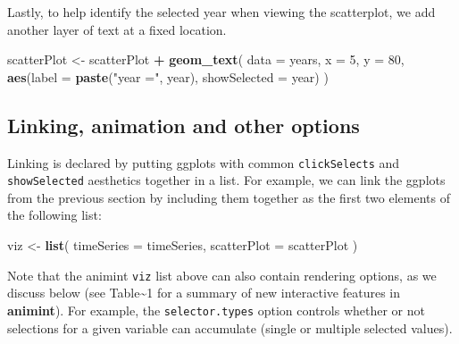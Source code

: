 \documentclass[12pt,]{article}
\newenvironment{Shaded}{\begin{snugshade}}{\end{snugshade}}
\newcommand{\DataTypeTok}[1]{\textcolor[rgb]{0.13,0.29,0.53}{#1}}
\newcommand{\DecValTok}[1]{\textcolor[rgb]{0.00,0.00,0.81}{#1}}
\newcommand{\KeywordTok}[1]{\textcolor[rgb]{0.13,0.29,0.53}{\textbf{#1}}}
\newcommand{\NormalTok}[1]{#1}
\newcommand{\OperatorTok}[1]{\textcolor[rgb]{0.81,0.36,0.00}{\textbf{#1}}}
\newcommand{\StringTok}[1]{\textcolor[rgb]{0.31,0.60,0.02}{#1}}
\theoremstyle{definition}
\theoremstyle{definition}
\theoremstyle{definition}
\theoremstyle{remark}
\begin{document}
Lastly, to help identify the selected year when viewing the scatterplot,
we add another layer of text at a fixed location.

\begin{Shaded}
\begin{Highlighting}[]
\NormalTok{scatterPlot <-}\StringTok{ }\NormalTok{scatterPlot }\OperatorTok{+}\StringTok{ }\KeywordTok{geom_text}\NormalTok{(}
  \DataTypeTok{data =}\NormalTok{ years, }\DataTypeTok{x =} \DecValTok{5}\NormalTok{, }\DataTypeTok{y =} \DecValTok{80}\NormalTok{,}
  \KeywordTok{aes}\NormalTok{(}\DataTypeTok{label =} \KeywordTok{paste}\NormalTok{(}\StringTok{"year ="}\NormalTok{, year),}
      \DataTypeTok{showSelected =}\NormalTok{ year)}
\NormalTok{)}
\end{Highlighting}
\end{Shaded}

\hypertarget{animation}{%
\subsection{Linking, animation and other options}\label{animation}}

Linking is declared by putting ggplots with common \texttt{clickSelects}
and \texttt{showSelected} aesthetics together in a list. For example, we
can link the ggplots from the previous section by including them
together as the first two elements of the following list:

\begin{Shaded}
\begin{Highlighting}[]
\NormalTok{viz <-}\StringTok{ }\KeywordTok{list}\NormalTok{(}
  \DataTypeTok{timeSeries =}\NormalTok{ timeSeries,}
  \DataTypeTok{scatterPlot =}\NormalTok{ scatterPlot}
\NormalTok{  )}
\end{Highlighting}
\end{Shaded}

Note that the animint \texttt{viz} list above can also contain rendering
options, as we discuss below (see Table\textasciitilde{}1 for a summary
of new interactive features in \textbf{animint}). For example, the
\texttt{selector.types} option controls whether or not selections for a
given variable can accumulate (single or multiple selected values).

\begin{Shaded}
\end{Shaded}
\end{document}
